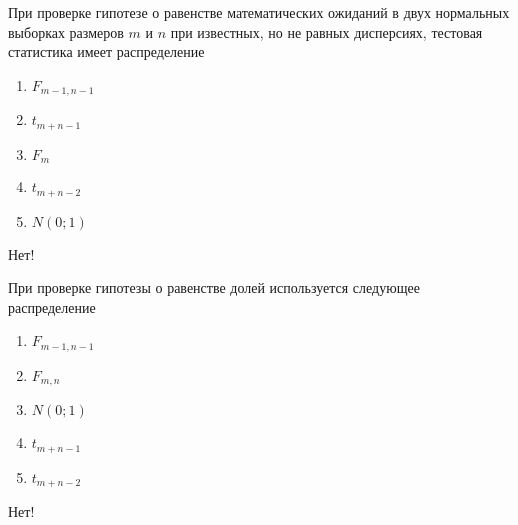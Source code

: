 \documentclass[t]{beamer}
\begin{document}
 \begin{frame} \label{5-No} 
\begin{block}{5} 

  При проверке гипотезе о равенстве математических ожиданий в двух нормальных выборках размеров $m$ и $n$ при известных, но не равных дисперсиях, тестовая статистика имеет распределение
  


 \end{block} 
\begin{enumerate} 
\item[] \hyperlink{5-No}{\beamergotobutton{} $F_{m-1,n-1}$}
\item[] \hyperlink{5-No}{\beamergotobutton{} $t_{m+n-1}$}
\item[] \hyperlink{5-No}{\beamergotobutton{} $F_m$}
\item[] \hyperlink{5-No}{\beamergotobutton{} $t_{m+n-2}$}
\item[] \hyperlink{5-Yes}{\beamergotobutton{} $N(0;1)$}
\end{enumerate} 

 \alert{Нет!} 
\end{frame} 


 \begin{frame} \label{6-No} 
\begin{block}{6} 

  При проверке гипотезы о равенстве долей используется следующее распределение
  


 \end{block} 
\begin{enumerate} 
\item[] \hyperlink{6-No}{\beamergotobutton{} $F_{m-1,n-1}$}
\item[] \hyperlink{6-No}{\beamergotobutton{} $F_{m, n}$}
\item[] \hyperlink{6-Yes}{\beamergotobutton{} $N(0;1)$}
\item[] \hyperlink{6-No}{\beamergotobutton{} $t_{m+n-1}$}
\item[] \hyperlink{6-No}{\beamergotobutton{} $t_{m+n-2}$}
\end{enumerate} 

 \alert{Нет!} 
\end{frame} 
\end{document}
